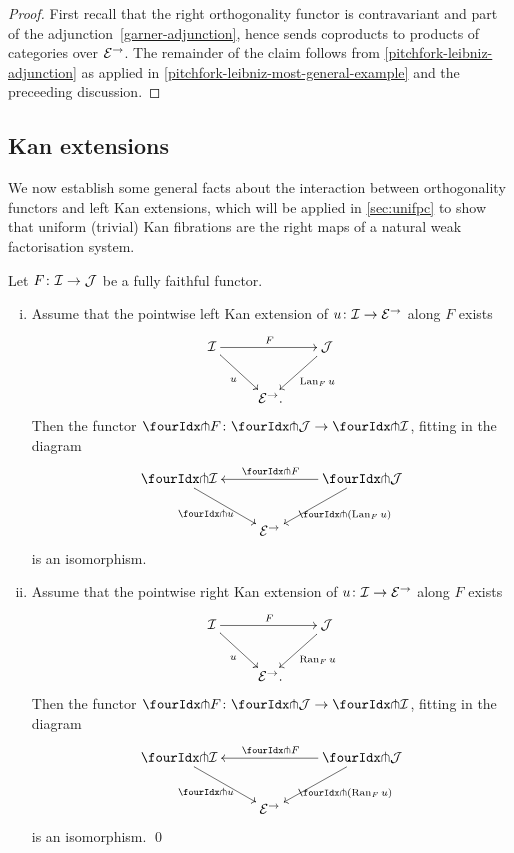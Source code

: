 \documentclass[reqno,10pt,a4paper,oneside,draft]{amsart}
\begin{document}
\begin{proof}
First recall that the right orthogonality functor is contravariant and part of the adjunction~\eqref{garner-adjunction}, hence sends coproducts to products of categories over $\mathcal{E}^\to$.
The remainder of the claim follows from \cref{pitchfork-leibniz-adjunction} as applied in \cref{pitchfork-leibniz-most-general-example} and the preceeding discussion.
\end{proof}

\subsection*{Kan extensions}

We now establish some general facts about the interaction between orthogonality functors and left Kan extensions, which will be applied in \cref{sec:unifpc} to show that uniform (trivial) Kan fibrations are the right maps of a natural weak factorisation system.

\begin{proposition} \label{kan-extension-closure}
Let $F \colon \mathcal{I} \to \mathcal{J}$ be a fully faithful functor.
\begin{enumerate}[(i)]
\item Assume that the pointwise left Kan extension of $u \colon \mathcal{I} \to \mathcal{E}^\to$ along $F$ exists
\[
\xymatrix{
  \cal{I}
  \ar[dr]_{u}
  \ar[rr]^{F}
&&
  \cal{J}
  \ar[dl]^{\Lan_F u}
\\&
  \catE^\to \rlap{.}
}
\]
Then the functor $\liftr{F} \co \liftr{\cal{J}} \to \liftr{\cal{I}}$, fitting in the diagram
\[
\xymatrix{
  \liftr{\cal{I}}
  \ar[dr]_{\liftr{u}}
&&
  \liftr{\cal{J}}
  \ar[ll]_{\liftr{F}}
  \ar[dl]^{\liftr{(\Lan_F u)}}
\\&
  \catE^\to
}
\]
is an isomorphism.
\item Assume that the pointwise right Kan extension of $u \colon \mathcal{I} \to \mathcal{E}^\to$ along $F$ exists
\[
\xymatrix{
  \cal{I}
  \ar[dr]_{u}
  \ar[rr]^{F}
&&
  \cal{J}
  \ar[dl]^{\Ran_F u}
\\&
  \catE^\to \rlap{.}
}
\]
Then the functor $\liftl{F} \co \liftl{\cal{J}} \to \liftl{\cal{I}}$, fitting in the diagram
\[
\xymatrix{
  \liftl{\cal{I}}
  \ar[dr]_{\liftl{u}}
&&
  \liftl{\cal{J}}
  \ar[ll]_{\liftl{F}}
  \ar[dl]^{\liftl{(\Ran_F u)}}
\\&
  \catE^\to
}
\]
is an isomorphism.
\qed
\end{enumerate}
\end{proposition}
\end{document}
